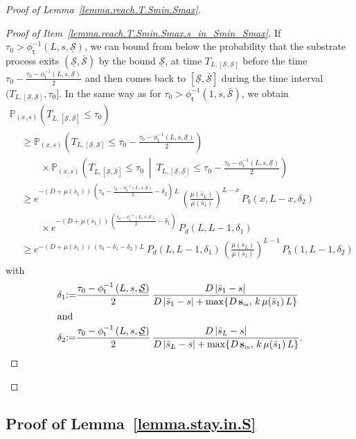 \documentclass[10pt]{amsart}
\theoremstyle{definition}\newtheorem{defi}[theo]{Definition}\newtheorem{rema}[theo]{Remark}\newtheorem{exam}[theo]{Example}\newtheorem{exem}[theo]{Example}\newtheorem{nota}[theo]{Notation}
\newcommand{\PP}{\mathbb{P}}
\newcommand{\Sin}{{\mathbf s}_{\textrm{\tiny\rm in}}}
\newcommand{\Smin}{\underline{\mathcal{S}}}
\newcommand{\Smax}{\bar{\mathcal{S}}}
\newcommand{\barmu}{\mu(\bar s_1)}
\newcommand{\phit}{\phi_\textsf{t}^{-1}}
\newcommand{\1}{\mathbf{1}}
\begin{document}
\begin{proof}[Proof of Lemma~\ref{lemma.reach.T.Smin.Smax}]
\begin{proof}[{Proof of Item~\eqref{lemma.reach.T.Smin.Smax.s_in_Smin_Smax}}]
If $\tau_0>\phit\left(L, s,\Smin\right)$, we can bound from below the probability that the substrate process exits $(\Smin,\Smax)$ by the bound $\Smin$, at time $T_{L,[\Smin,\Smin]}$ before the time $\tau_0-\frac{\tau_0-\phit\left(L, s,\Smin\right)}{2}$ and then comes back to $[\Smin,\Smax]$ during the time interval $(T_{L,[\Smin,\Smin]},\tau_0]$. In the same way as for $\tau_0>\phit\left(1, s,\Smax\right)$, we obtain
\begin{multline*}
 \PP_{(x,s)}\left(T_{L,[\Smin,\Smax]}\leq \tau_0\right)\\
\begin{aligned}
&\geq
\PP_{(x,s)}\left(T_{L,[\Smin,\Smin]}\leq \tau_0-\frac{\tau_0-\phit\left(L, s,\Smin\right)}{2}\right)
\\
& \qquad\times
\PP_{(x,s)}\left(T_{L,[\Smin,\Smax]}\leq\tau_0 \ \middle| \ T_{L,[\Smin,\Smin]}\leq \tau_0-\frac{\tau_0-\phit\left(L, s,\Smin\right)}{2} \right)
\\
&\geq e^{-(D+\barmu)\,\left(\tau_0-\frac{\tau_0-\phit\left(L, s,\Smin\right)}{2}-\delta_2\right)\,L}\,
\left(\frac{\mu(\bar s_L)}{\barmu}\right)^{L-x}\,P_b(x,L-x, \delta_2)
\\
& \qquad
\times e^{-(D+\barmu)\,\left(\frac{\tau_0-\phit\left(L, s,\Smin\right)}{2}-\delta_1\right)}\, P_d(L,L-1, \delta_1)
\\
&\geq e^{-(D+\barmu)\,\left(\tau_0-\delta_1-\delta_2\right)\,L}\, P_d(L,L-1, \delta_1)\,
\left(\frac{\mu(\bar s_L)}{\barmu}\right)^{L-1}\,P_b(1,L-1, \delta_2)
\end{aligned}
\end{multline*}
with 
\begin{align*}
\delta_1 &{:=}\frac{\tau_0-\phit\left(L, s,\Smin\right)}{2}\,\frac{D\,|\bar s_1-s|}{D\,|\bar s_1-s|+\max\{D\,\Sin,\,k\,\barmu\,L\}}\\
\intertext{and}
\delta_2 &{:=}\frac{\tau_0-\phit\left(L, s,\Smin\right)}{2}\,\frac{D\,|\bar s_L-s|}{D\,|\bar s_L-s|+\max\{D\,\Sin,\,k\,\barmu\,L\}}.\qedhere
\end{align*}
\end{proof}\let\qed\relax
\end{proof}



\subsection{Proof of Lemma~\ref{lemma.stay.in.S}}\label{sec:stay.in.S}
\end{document}
